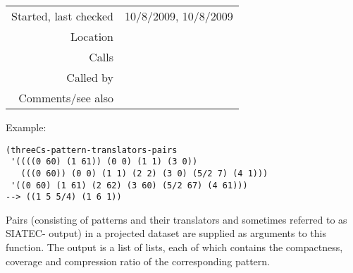 \vspace{0.3cm}
\begin{tabular}{r|p{8cm}}
Started, last checked & 10/8/2009, 10/8/2009 \\
Location & \nameref{sec:evaluation-for-SIA+} \\
Calls & \nameref{fun:threeCs-pattern-translators-pair} \\
Called by & \\
Comments/see also &
\end{tabular}

\vspace{0.5cm}
\noindent Example:
\begin{verbatim}
(threeCs-pattern-translators-pairs
 '((((0 60) (1 61)) (0 0) (1 1) (3 0))
   (((0 60)) (0 0) (1 1) (2 2) (3 0) (5/2 7) (4 1)))
 '((0 60) (1 61) (2 62) (3 60) (5/2 67) (4 61)))
--> ((1 5 5/4) (1 6 1))
\end{verbatim}

\noindent Pairs (consisting of patterns and their
translators and sometimes referred to as SIATEC-
output) in a projected dataset are supplied as
arguments to this function. The output is a list of
lists, each of which contains the compactness,
coverage and compression ratio of the corresponding
pattern.
























